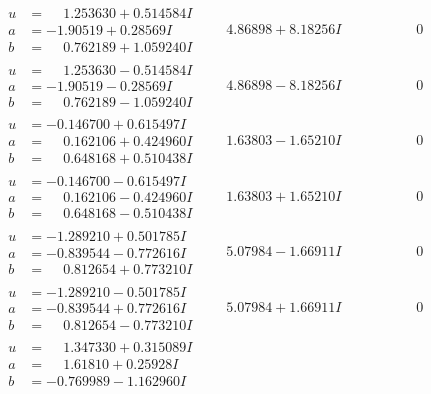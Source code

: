 \documentclass[1p]{elsarticle_modified}
\theoremstyle{definition}
\begin{document}
$$\begin{array}{c|c|c}
\begin{aligned}
u &= \phantom{-}1.253630 + 0.514584 I \\
a &= -1.90519 + 0.28569 I \\
b &= \phantom{-}0.762189 + 1.059240 I\end{aligned}
 & \phantom{-}4.86898 + 8.18256 I & \phantom{-0.000000 } 0 \\ \hline\begin{aligned}
u &= \phantom{-}1.253630 - 0.514584 I \\
a &= -1.90519 - 0.28569 I \\
b &= \phantom{-}0.762189 - 1.059240 I\end{aligned}
 & \phantom{-}4.86898 - 8.18256 I & \phantom{-0.000000 } 0 \\ \hline\begin{aligned}
u &= -0.146700 + 0.615497 I \\
a &= \phantom{-}0.162106 + 0.424960 I \\
b &= \phantom{-}0.648168 + 0.510438 I\end{aligned}
 & \phantom{-}1.63803 - 1.65210 I & \phantom{-0.000000 } 0 \\ \hline\begin{aligned}
u &= -0.146700 - 0.615497 I \\
a &= \phantom{-}0.162106 - 0.424960 I \\
b &= \phantom{-}0.648168 - 0.510438 I\end{aligned}
 & \phantom{-}1.63803 + 1.65210 I & \phantom{-0.000000 } 0 \\ \hline\begin{aligned}
u &= -1.289210 + 0.501785 I \\
a &= -0.839544 - 0.772616 I \\
b &= \phantom{-}0.812654 + 0.773210 I\end{aligned}
 & \phantom{-}5.07984 - 1.66911 I & \phantom{-0.000000 } 0 \\ \hline\begin{aligned}
u &= -1.289210 - 0.501785 I \\
a &= -0.839544 + 0.772616 I \\
b &= \phantom{-}0.812654 - 0.773210 I\end{aligned}
 & \phantom{-}5.07984 + 1.66911 I & \phantom{-0.000000 } 0 \\ \hline\begin{aligned}
u &= \phantom{-}1.347330 + 0.315089 I \\
a &= \phantom{-}1.61810 + 0.25928 I \\
b &= -0.769989 - 1.162960 I\end{aligned}

\end{array}$$
\end{document}
